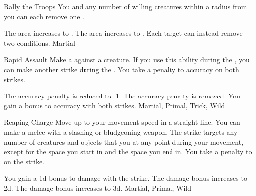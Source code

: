 \lowercase{\hypertarget{maneuver:Rally the Troops}{}}\label{maneuver:Rally the Troops}
\begin{apability}{\hypertarget{maneuver:Rally the Troops}{Rally the Troops}}
You and any number of willing creatures within a \areamed radius from you
can each remove one .

\rankline
{} The area increases to \arealarge.
 The area increases to \areahuge.
 Each target can instead remove two conditions.
 Martial
\end{apability}
\vspace{0.25em}



\lowercase{\hypertarget{maneuver:Rapid Assault}{}}\label{maneuver:Rapid Assault}
\begin{apability}{\hypertarget{maneuver:Rapid Assault}{Rapid Assault}}
Make a  against a creature.
If you use this ability during the , you can make another strike during the .
You take a  penalty to accuracy on both strikes.

\rankline
{} The accuracy penalty is reduced to -1.
 The accuracy penalty is removed.
 You gain a  bonus to accuracy with both strikes.
 Martial, Primal, Trick, Wild
\end{apability}
\vspace{0.25em}



\lowercase{\hypertarget{maneuver:Reaping Charge}{}}\label{maneuver:Reaping Charge}
\begin{apability}{\hypertarget{maneuver:Reaping Charge}{Reaping Charge}}
Move up to your movement speed in a straight line.
You can make a melee  with a slashing or bludgeoning weapon.
The strike targets any number of creatures and objects that you  at any point during your movement, except for the space you start in and the space you end in.
You take a  penalty to  on the strike.

\rankline
{} You gain a \plus1d bonus to damage with the strike.
 The damage bonus increases to \plus2d.
 The damage bonus increases to \plus3d.
 Martial, Primal, Wild
\end{apability}
\vspace{0.25em}



